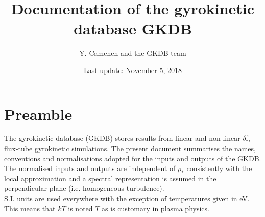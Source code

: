 \documentclass[a4paper]{report}
\begin{document}
\title{Documentation of the  gyrokinetic database GKDB}

\author{Y. Camenen and the GKDB team}

\date{Last update: November 5, 2018}

\maketitle


\tableofcontents

\chapter{Preamble}

The gyrokinetic database (GKDB) stores results from linear and non-linear $\delta$f, flux-tube gyrokinetic simulations. The present document summarises the names, conventions and normalisations adopted for the inputs and outputs of the  GKDB.\\ 
The normalised inputs and outputs are independent of $\rho_*$ consistently with the local approximation and a spectral representation is assumed in the perpendicular plane (i.e. homogeneous turbulence).\\
S.I. units are used everywhere with the exception of temperatures given in eV. This means that $kT$ is noted $T$ as is customary in plasma physics.
\end{document}
